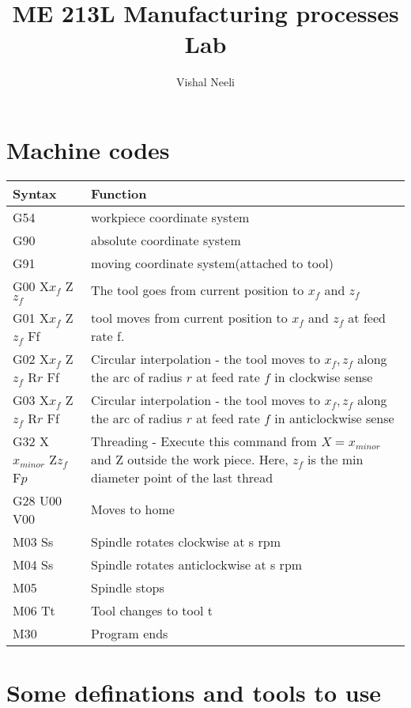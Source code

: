 \documentclass{article}
\title{ME 213L Manufacturing processes Lab}
\author{Vishal Neeli}
\begin{document}
\maketitle

\section{Machine codes}
\begin{tabular}{|m{12em}|m{30em}|}
	\hline
	\textbf{Syntax} & \textbf{Function}\\
	\hline
	\hline
	G54 & workpiece coordinate system\\
	\hline
	G90 & absolute coordinate system\\
	\hline
	G91 & moving coordinate system(attached to tool)\\
	\hline
	G00 X$x_f$ Z$z_f$ & The tool goes from current position to $x_f$ and $z_f$\\
	\hline
	G01 X$x_f$ Z$z_f$ Ff & tool moves from current position to $x_f$ and $z_f$ at feed rate f.\\
	\hline
	G02 X$x_f$ Z$z_f$ R$r$ Ff & Circular interpolation - the tool moves to $x_f,z_f$ along the arc of radius $r$ at feed rate $f$ in clockwise sense\\
	\hline
	G03 X$x_f$ Z$z_f$ R$r$ Ff & Circular interpolation - the tool moves to $x_f,z_f$ along the arc of radius $r$ at feed rate $f$ in anticlockwise sense\\
	\hline
	G32 X$x_{minor}$ Z$z_f$ F$p$ & Threading - Execute this command from $X=x_{minor}$ and Z outside the work piece. Here, $z_f$ is the min diameter point of the last thread\\
	\hline
	G28 U00 V00 & Moves to home \\%
	\hline
	M03 Ss & Spindle rotates clockwise at s rpm\\
	\hline
	M04 Ss & Spindle rotates anticlockwise at s rpm\\
	M05 & Spindle stops\\
	\hline
	M06 Tt & Tool changes to tool t\\
	\hline
	M30 & Program ends\\
	\hline
	
\end{tabular}


\section{Some definations and tools to use}
\end{document}
